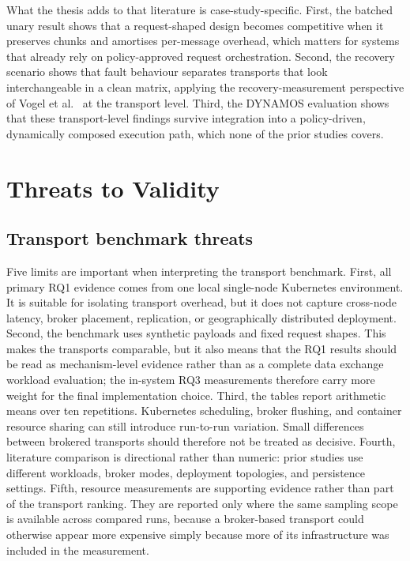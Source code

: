 What the thesis adds to that literature is case-study-specific. First, the batched unary result shows that a request-shaped design becomes competitive when it preserves chunks and amortises per-message overhead, which matters for systems that already rely on policy-approved request orchestration. Second, the recovery scenario shows that fault behaviour separates transports that look interchangeable in a clean matrix, applying the recovery-measurement perspective of Vogel et al.~\cite{vogel2024faultRecovery} at the transport level. Third, the DYNAMOS evaluation shows that these transport-level findings survive integration into a policy-driven, dynamically composed execution path, which none of the prior studies covers.

\section{Threats to Validity}\label{sec:threats-validity}

\subsection{Transport benchmark threats}

Five limits are important when interpreting the transport benchmark. First, all primary RQ1 evidence comes from one local single-node Kubernetes environment. It is suitable for isolating transport overhead, but it does not capture cross-node latency, broker placement, replication, or geographically distributed deployment. Second, the benchmark uses synthetic payloads and fixed request shapes. This makes the transports comparable, but it also means that the RQ1 results should be read as mechanism-level evidence rather than as a complete data exchange workload evaluation; the in-system RQ3 measurements therefore carry more weight for the final implementation choice. Third, the tables report arithmetic means over ten repetitions. Kubernetes scheduling, broker flushing, and container resource sharing can still introduce run-to-run variation. Small differences between brokered transports should therefore not be treated as decisive. Fourth, literature comparison is directional rather than numeric: prior studies use different workloads, broker modes, deployment topologies, and persistence settings. Fifth, resource measurements are supporting evidence rather than part of the transport ranking. They are reported only where the same sampling scope is available across compared runs, because a broker-based transport could otherwise appear more expensive simply because more of its infrastructure was included in the measurement.

